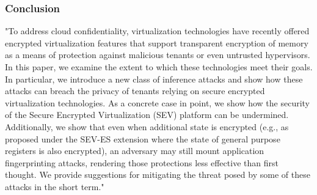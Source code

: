 \subsubsection*{Conclusion \cite{2019-werner}}
"To address cloud confidentiality, virtualization technologies have recently offered encrypted virtualization features that support transparent encryption of memory as a means of protection against
malicious tenants or even untrusted hypervisors. In this paper, we
examine the extent to which these technologies meet their goals.
In particular, we introduce a new class of inference attacks and
show how these attacks can breach the privacy of tenants relying
on secure encrypted virtualization technologies. As a concrete case
in point, we show how the security of the Secure Encrypted Virtualization (SEV) platform can be undermined. Additionally, we
show that even when additional state is encrypted (e.g., as proposed
under the SEV-ES extension where the state of general purpose registers is also encrypted), an adversary may still mount application
fingerprinting attacks, rendering those protections less effective
than first thought. We provide suggestions for mitigating the threat
posed by some of these attacks in the short term."
